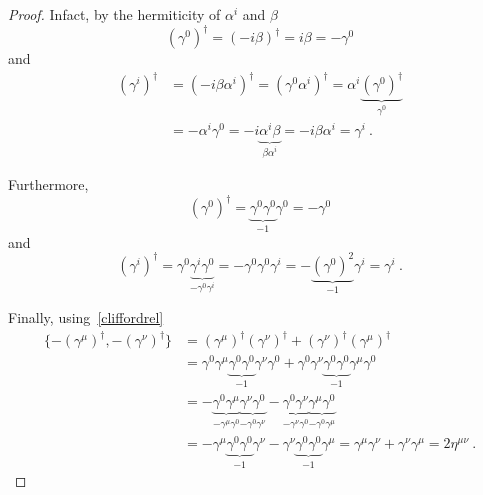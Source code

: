     \begin{proof}
        Infact, by the hermiticity of $\alpha^i$ and $\beta$
        \begin{equation*}
            (\gamma^0)^\dagger = (- i \beta)^\dagger = i \beta = - \gamma^0
        \end{equation*}
        and 
        \begin{equation*}
        \begin{aligned}
            (\gamma^i)^\dagger & = (- i \beta \alpha^i)^\dagger  = (\gamma^0 \alpha^i)^\dagger = \alpha^i \underbrace{(\gamma^0)^\dagger}_{\gamma^0} \\ & = - \alpha^i \gamma^0 = - i \underbrace{\alpha^i \beta}_{\beta \alpha^i} = - i \beta \alpha^i = \gamma^i ~.
        \end{aligned}
        \end{equation*}
        
        Furthermore,
        \begin{equation*}
            (\gamma^0)^\dagger = \underbrace{\gamma^0 \gamma^0}_{-1} \gamma^0 = - \gamma^0
        \end{equation*}
        and 
        \begin{equation*}
            (\gamma^i)^\dagger = \gamma^0 \underbrace{\gamma^i \gamma^0}_{-\gamma^0 \gamma^i} = - \gamma^0 \gamma^0 \gamma^i = - \underbrace{(\gamma^0)^2}_{-1} \gamma^i = \gamma^i ~.
        \end{equation*}

        Finally, using~\eqref{cliffordrel}
        \begin{equation*}
        \begin{aligned}
            \{- (\gamma^\mu)^\dagger, - (\gamma^\nu)^\dagger \} & = (\gamma^\mu)^\dagger (\gamma^\nu)^\dagger + (\gamma^\nu)^\dagger (\gamma^\mu)^\dagger \\ & = \gamma^0 \gamma^\mu \underbrace{\gamma^0 \gamma^0}_{-1} \gamma^\nu \gamma^0 + \gamma^0 \gamma^\nu \underbrace{\gamma^0 \gamma^0}_{-1} \gamma^\mu \gamma^0 \\ & = - \underbrace{\gamma^0 \gamma^\mu}_{- \gamma^\mu \gamma^0} \underbrace{\gamma^\nu \gamma^0}_{- \gamma^0 \gamma^\nu} - \underbrace{\gamma^0 \gamma^\nu}_{- \gamma^\nu \gamma^0} \underbrace{\gamma^\mu \gamma^0}_{- \gamma^0 \gamma^\mu} \\ & = - \gamma^\mu \underbrace{\gamma^0 \gamma^0}_{-1} \gamma^\nu - \gamma^\nu \underbrace{\gamma^0 \gamma^0}_{-1} \gamma^\mu = \gamma^\mu \gamma^\nu + \gamma^\nu \gamma^\mu = 2 \eta^{\mu\nu} ~.
        \end{aligned}
        \end{equation*}
    \end{proof}

